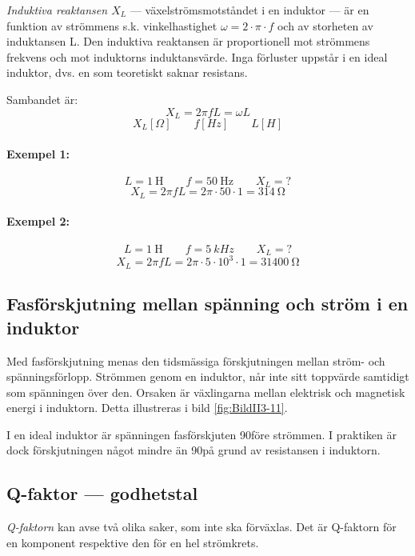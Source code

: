 \emph{Induktiva reaktansen \(X_L\)} --- växelströmsmotståndet i en induktor --- är
en funktion av strömmens s.k. vinkelhastighet \(\omega = 2 \cdot \pi  \cdot f\)
och av storheten av induktansen L.
Den induktiva reaktansen är proportionell mot strömmens frekvens och mot
induktorns induktansvärde. Inga förluster uppstår i en ideal induktor, dvs. en
som teoretiskt saknar resistans.

Sambandet är:
\[X_L = 2\pi fL = \omega L\]
\[ X_L \unit{[\Omega]} \qquad f \unit{[Hz]} \qquad L \unit{[H]} \]

\noindent\paragraph{Exempel 1:}
\[ L = \SI{1}{\henry} \qquad f = \SI{50}{\hertz} \qquad X_L = ? \]
\[  X_L = 2\pi fL = 2\pi  \cdot 50 \cdot 1 = \SI{314}{\ohm}  \]

\noindent\paragraph{Exempel 2:}
\[ L = \SI{1}{\henry} \qquad f = \SI{5}{kHz} \qquad X_L = ? \]
\[ X_L = 2\pi fL = 2\pi  \cdot 5 \cdot 10^3 \cdot 1 = \SI{31400}{\ohm} \]

\subsection{Fasförskjutning mellan spänning och ström i en induktor}

Med fasförskjutning menas den tidsmässiga förskjutningen mellan ström- och
spänningsförlopp. Strömmen genom en induktor, når inte sitt toppvärde samtidigt
som spänningen över den. Orsaken är växlingarna mellan elektrisk och magnetisk
energi i induktorn.
Detta illustreras i bild \ref{fig:BildII3-11}.

I en ideal induktor är spänningen fasförskjuten 90\degree före strömmen.
I praktiken är dock förskjutningen något mindre än 90\degree på grund av
resistansen i induktorn.

\subsection{Q-faktor --- godhetstal}

\emph{Q-faktorn} kan avse två olika saker, som inte ska förväxlas.
Det är Q-faktorn för en komponent respektive den för en hel strömkrets.

